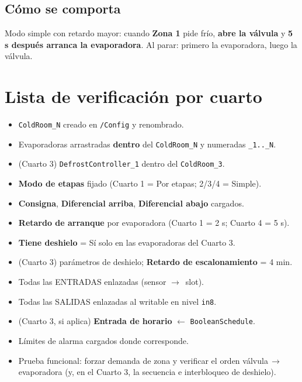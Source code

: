 \documentclass[11pt,a4paper]{article}
\newcommand{\ra}{\textcolor{frio}{$\rightarrow$}}
\newcommand{\slot}[1]{\textbf{#1}}
\newcommand{\code}[1]{\texttt{#1}}
\begin{document}
\subsection{Cómo se comporta}
\begin{comporta}
Modo simple con retardo mayor: cuando \textbf{Zona 1} pide frío, \textbf{abre la válvula} y
\textbf{5 s después arranca la evaporadora}. Al parar: primero la evaporadora, luego la válvula.
\end{comporta}

\section{Lista de verificación por cuarto}
\begin{itemize}[label=$\square$,leftmargin=1.6em,itemsep=3pt]
  \item \code{ColdRoom_N} creado en \code{/Config} y renombrado.
  \item Evaporadoras arrastradas \textbf{dentro} del \code{ColdRoom_N} y numeradas \code{_1.._N}.
  \item (Cuarto 3) \code{DefrostController_1} dentro del \code{ColdRoom_3}.
  \item \slot{Modo de etapas} fijado (Cuarto 1 = Por etapas; 2/3/4 = Simple).
  \item \slot{Consigna}, \slot{Diferencial arriba}, \slot{Diferencial abajo} cargados.
  \item \slot{Retardo de arranque} por evaporadora (Cuarto 1 = 2 s; Cuarto 4 = 5 s).
  \item \slot{Tiene deshielo} = Sí solo en las evaporadoras del Cuarto 3.
  \item (Cuarto 3) parámetros de deshielo; \slot{Retardo de escalonamiento} = 4 min.
  \item Todas las ENTRADAS enlazadas (sensor \ra\ slot).
  \item Todas las SALIDAS enlazadas al writable en nivel \code{in8}.
  \item (Cuarto 3, si aplica) \slot{Entrada de horario} $\leftarrow$ \code{BooleanSchedule}.
  \item Límites de alarma cargados donde corresponde.
  \item Prueba funcional: forzar demanda de zona y verificar el orden válvula\,\ra\,evaporadora (y, en el
        Cuarto 3, la secuencia e interbloqueo de deshielo).
\end{itemize}

\end{document}
